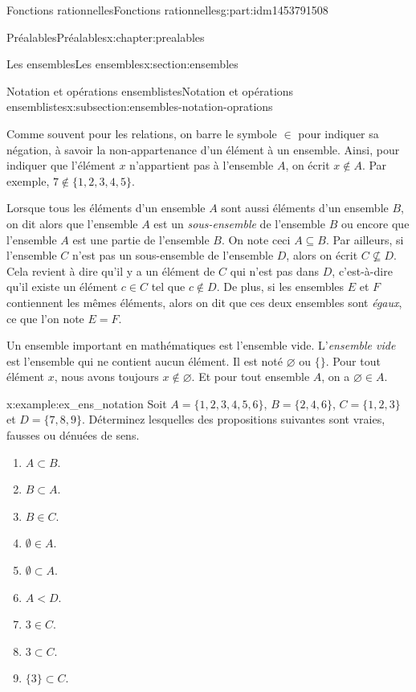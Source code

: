 \documentclass[oneside,10pt,]{book}
\newcommand{\lt}{<}
\begin{document}
\begin{partptx}{Fonctions rationnelles}{}{Fonctions rationnelles}{}{}{g:part:idm1453791508}
\begin{chapterptx}{Préalables}{}{Préalables}{}{}{x:chapter:prealables}
\begin{sectionptx}{Les ensembles}{}{Les ensembles}{}{}{x:section:ensembles}
\begin{subsectionptx}{Notation et opérations ensemblistes}{}{Notation et opérations ensemblistes}{}{}{x:subsection:ensembles-notation-oprations}
\par
Comme souvent pour les relations, on barre le symbole \(\in\) pour indiquer sa négation, à savoir la non-appartenance d’un élément à un ensemble. Ainsi, pour indiquer que l'élément \(x\) n'appartient pas à l'ensemble \(A\), on écrit \(x \notin A\). Par exemple, \(7 \notin \{1,2,3,4,5\}\).%
\par
Lorsque tous les éléments d'un ensemble \(A\) sont aussi éléments d'un ensemble \(B\), on dit alors que l'ensemble \(A\) est un \emph{sous-ensemble} de l'ensemble \(B\) ou encore que l'ensemble \(A\) est une partie de l'ensemble \(B\). On note ceci \(A \subseteq B\). Par ailleurs, si l'ensemble \(C\) n'est pas un sous-ensemble de l'ensemble \(D\), alors on écrit \(C \not\subseteq D\). Cela revient à dire qu'il y a un élément de \(C\) qui n'est pas dans \(D\), c'est-à-dire qu'il existe un élément \(c \in C\) tel que \(c \notin D\). De plus, si les ensembles \(E\) et \(F\) contiennent les mêmes éléments, alors on dit que ces deux ensembles sont \emph{égaux}, ce que l'on note \(E = F\).%
\par
Un ensemble important en mathématiques est l'ensemble vide. L'\emph{ensemble vide} est l'ensemble qui ne contient aucun élément. Il est noté \(\varnothing\) ou \(\{ \}\). Pour tout élément \(x\), nous avons toujours \(x \notin \varnothing\). Et pour tout ensemble \(A\), on a \(\varnothing \in A\).%
\begin{example}{}{x:example:ex_ens_notation}%
Soit \(A = \{1,2,3,4,5,6\}\), \(B = \{2,4,6\}\), \(C = \{1,2,3\}\) et \(D = \{7,8,9\}\). Déterminez lesquelles des propositions suivantes sont vraies, fausses ou dénuées de sens.%
\par
%
\begin{multicols}{3}
\begin{enumerate}
\item{}\(A \subset B\).%
\item{}\(B \subset A\).%
\item{}\(B \in C\).%
\item{}\(\emptyset \in A\).%
\item{}\(\emptyset \subset A\).%
\item{}\(A \lt D\).%
\item{}\(3 \in C\).%
\item{}\(3 \subset C\).%
\item{}\(\{3\} \subset C\).%
\end{enumerate}
\end{multicols}
%
\par\smallskip%

\end{example}
\end{subsectionptx}
\end{sectionptx}
\end{chapterptx}
\end{partptx}
\end{document}
